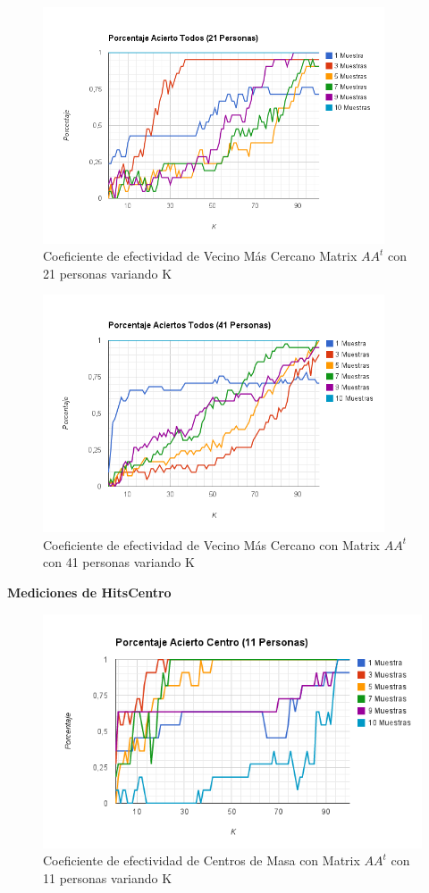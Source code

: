 \begin{figure}[H]
\includegraphics[width=0.9\textwidth]{img/imagef11.png}
     \caption{Coeficiente de efectividad de Vecino Más Cercano Matrix $AA^t$ con 21 personas variando K}
\end{figure}

\begin{figure}[H]
\includegraphics[width=0.9\textwidth]{img/imagef12.png}
     \caption{Coeficiente de efectividad de Vecino Más Cercano con Matrix $AA^t$ con 41 personas variando K}
\end{figure}

\textbf{Mediciones de HitsCentro }

\begin{figure}[H]
\includegraphics[width=1\textwidth]{img/imagef13.png}
     \caption{Coeficiente de efectividad de Centros de Masa con Matrix $AA^t$ con 11 personas variando K}
\end{figure}

